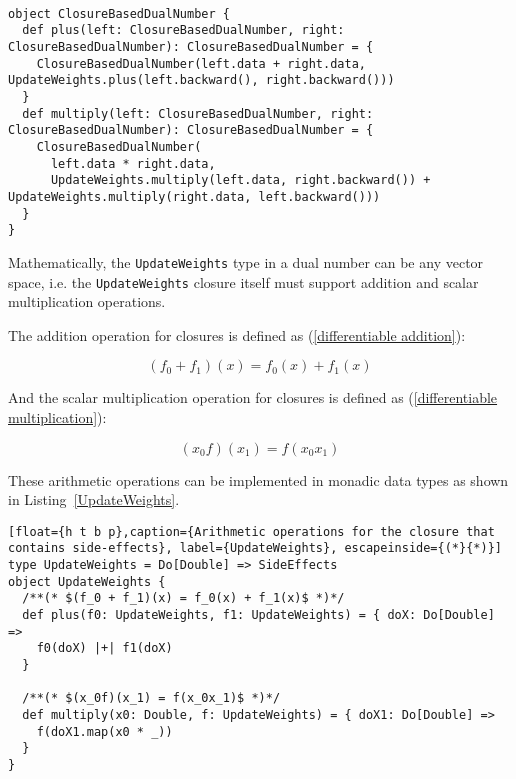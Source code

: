 \begin{lstlisting}[float={h t b p},caption={Replacing operations on \lstinline{PartialDelta} to custom functions for \lstinline{UpdateWeights}}, label={object ClosureBasedDualNumber}]  

object ClosureBasedDualNumber {
  def plus(left: ClosureBasedDualNumber, right: ClosureBasedDualNumber): ClosureBasedDualNumber = {
    ClosureBasedDualNumber(left.data + right.data, UpdateWeights.plus(left.backward(), right.backward()))
  }
  def multiply(left: ClosureBasedDualNumber, right: ClosureBasedDualNumber): ClosureBasedDualNumber = {
    ClosureBasedDualNumber(
      left.data * right.data,
      UpdateWeights.multiply(left.data, right.backward()) + UpdateWeights.multiply(right.data, left.backward()))
  }
}
\end{lstlisting}


Mathematically, the \lstinline{UpdateWeights} type in a dual number can be any vector space, i.e. the \lstinline{UpdateWeights} closure itself must support addition and scalar multiplication operations.

The addition operation for closures is defined as (\ref{differentiable addition}):

\begin{equation}
\label{differentiable addition}
(f_0 + f_1)(x) = f_0(x) + f_1(x)
\end{equation}

And the scalar multiplication operation for closures is defined as (\ref{differentiable multiplication}):

\begin{equation}
\label{differentiable multiplication}
(x_0f)(x_1) = f(x_0x_1)
\end{equation}

These arithmetic operations can be implemented in monadic data types as shown in Listing~\ref{UpdateWeights}.

\begin{lstlisting}[float={h t b p},caption={Arithmetic operations for the closure that contains side-effects}, label={UpdateWeights}, escapeinside={(*}{*)}]
type UpdateWeights = Do[Double] => SideEffects
object UpdateWeights {
  /**(* $(f_0 + f_1)(x) = f_0(x) + f_1(x)$ *)*/
  def plus(f0: UpdateWeights, f1: UpdateWeights) = { doX: Do[Double] =>
    f0(doX) |+| f1(doX)
  }

  /**(* $(x_0f)(x_1) = f(x_0x_1)$ *)*/
  def multiply(x0: Double, f: UpdateWeights) = { doX1: Do[Double] =>
    f(doX1.map(x0 * _))
  }
}
\end{lstlisting}

